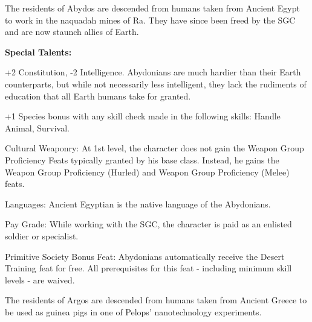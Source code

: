 The residents of Abydos are descended from humans taken from Ancient Egypt to work in the naquadah mines of Ra. They have since been freed by the SGC and are now staunch allies of Earth.

\textbf{Special Talents:}
\begin{itemize*}
\item +2 Constitution, -2 Intelligence. Abydonians are much hardier than their Earth counterparts, but while not necessarily less intelligent, they lack the rudiments of education that all Earth humans take for granted.
\item +1 Species bonus with any skill check made in the following skills: Handle Animal, Survival.
\item Cultural Weaponry: At 1st level, the character does not gain the Weapon Group Proficiency Feats typically granted by his base class. Instead, he gains the Weapon Group Proficiency (Hurled) and Weapon Group Proficiency (Melee) feats.
\item Languages: Ancient Egyptian is the native language of the Abydonians.
\item Pay Grade: While working with the SGC, the character is paid as an enlisted soldier or specialist.
\item Primitive Society Bonus Feat: Abydonians automatically receive the Desert Training feat for free. All prerequisites for this feat - including minimum skill levels - are waived.
\end{itemize*}

The residents of Argos are descended from humans taken from Ancient Greece to be used as guinea pigs in one of Pelops' nanotechnology experiments.

